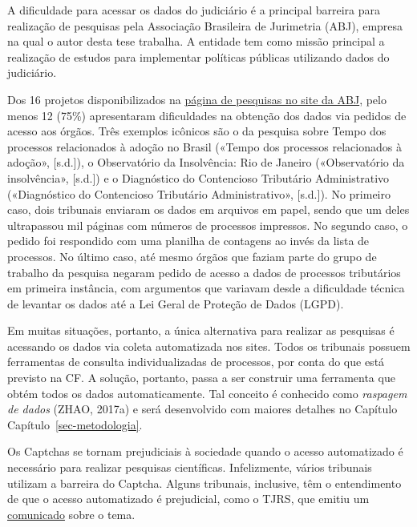 \documentclass[12pt,twoside,brazilian]{book}
\begin{document}
A dificuldade para acessar os dados do judiciário é a principal barreira
para realização de pesquisas pela Associação Brasileira de Jurimetria
(ABJ), empresa na qual o autor desta tese trabalha. A entidade tem como
missão principal a realização de estudos para implementar políticas
públicas utilizando dados do judiciário.

Dos 16 projetos disponibilizados na
\href{https://abj.org.br/pesquisas/}{página de pesquisas no site da
ABJ}, pelo menos 12 (75\%) apresentaram dificuldades na obtenção dos
dados via pedidos de acesso aos órgãos. Três exemplos icônicos são o da
pesquisa sobre Tempo dos processos relacionados à adoção no Brasil
({«Tempo dos processos relacionados à adoção»}, {[}s.d.{]}), o
Observatório da Insolvência: Rio de Janeiro ({«Observatório da
insolvência»}, {[}s.d.{]}) e o Diagnóstico do Contencioso Tributário
Administrativo ({«Diagnóstico do Contencioso Tributário
Administrativo»}, {[}s.d.{]}). No primeiro caso, dois tribunais enviaram
os dados em arquivos em papel, sendo que um deles ultrapassou mil
páginas com números de processos impressos. No segundo caso, o pedido
foi respondido com uma planilha de contagens ao invés da lista de
processos. No último caso, até mesmo órgãos que faziam parte do grupo de
trabalho da pesquisa negaram pedido de acesso a dados de processos
tributários em primeira instância, com argumentos que variavam desde a
dificuldade técnica de levantar os dados até a Lei Geral de Proteção de
Dados (LGPD).

Em muitas situações, portanto, a única alternativa para realizar as
pesquisas é acessando os dados via coleta automatizada nos sites. Todos
os tribunais possuem ferramentas de consulta individualizadas de
processos, por conta do que está previsto na CF. A solução, portanto,
passa a ser construir uma ferramenta que obtém todos os dados
automaticamente. Tal conceito é conhecido como \emph{raspagem de dados}
(ZHAO, 2017a) e será desenvolvido com maiores detalhes no Capítulo
Capítulo~\ref{sec-metodologia}.

Os Captchas se tornam prejudiciais à sociedade quando o acesso
automatizado é necessário para realizar pesquisas científicas.
Infelizmente, vários tribunais utilizam a barreira do Captcha. Alguns
tribunais, inclusive, têm o entendimento de que o acesso automatizado é
prejudicial, como o TJRS, que emitiu um
\href{https://www.tjrs.jus.br/novo/processos-e-servicos/processo-eletronico/acesso-robotizado-a-dados-publicos-e-duplamente-arriscado/}{comunicado}
sobre o tema.
\end{document}
